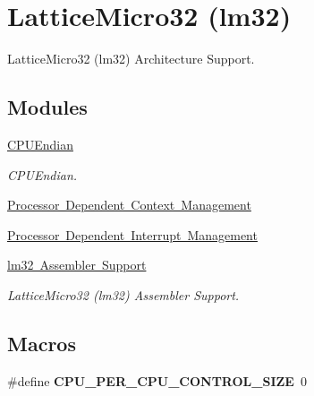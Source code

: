 \hypertarget{group__RTEMSScoreCPUlm32}{}\section{Lattice\+Micro32 (lm32)}
\label{group__RTEMSScoreCPUlm32}


Lattice\+Micro32 (lm32) Architecture Support.  


\subsection*{Modules}
\begin{DoxyCompactItemize}
\item 
\mbox{\hyperlink{group__RTEMSScoreCPUlm32CPUEndian}{C\+P\+U\+Endian}}
\begin{DoxyCompactList}\small\item\em C\+P\+U\+Endian. \end{DoxyCompactList}\item 
\mbox{\hyperlink{group__RTEMSScoreCPUlm32Context}{Processor Dependent Context Management}}
\item 
\mbox{\hyperlink{group__RTEMSScoreCPUlm32Interrupt}{Processor Dependent Interrupt Management}}
\item 
\mbox{\hyperlink{group__RTEMSScoreCPUlm32ASM}{lm32 Assembler Support}}
\begin{DoxyCompactList}\small\item\em Lattice\+Micro32 (lm32) Assembler Support. \end{DoxyCompactList}\end{DoxyCompactItemize}
\subsection*{Macros}
\begin{DoxyCompactItemize}
\item 
\mbox{\label{group__RTEMSScoreCPUlm32_gaf8e38596ad3db49995fd8eb9fb4e86b2}} 
\#define {\bfseries C\+P\+U\+\_\+\+P\+E\+R\+\_\+\+C\+P\+U\+\_\+\+C\+O\+N\+T\+R\+O\+L\+\_\+\+S\+I\+ZE}~0
\end{DoxyCompactItemize}
